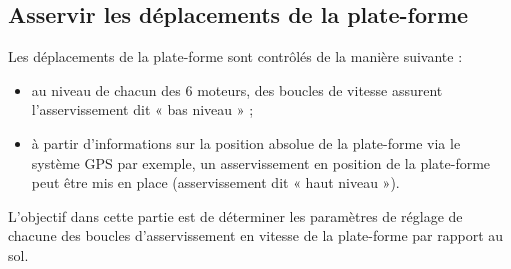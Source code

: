 \subsection{Asservir les déplacements de la plate-forme}
\ifprof
\else

Les déplacements de la plate-forme sont contrôlés de la manière suivante :
\begin{itemize}
\item au niveau de chacun des 6 moteurs, des boucles de vitesse assurent l’asservissement dit « bas niveau » ;
\item à partir d’informations sur la position absolue de la plate-forme via le système GPS par exemple, un asservissement en position de la plate-forme peut être mis en place (asservissement dit « haut niveau »).
\end{itemize}
L’objectif dans cette partie est de déterminer les paramètres de réglage de chacune des boucles d’asservissement en vitesse de la plate-forme par rapport au sol.

